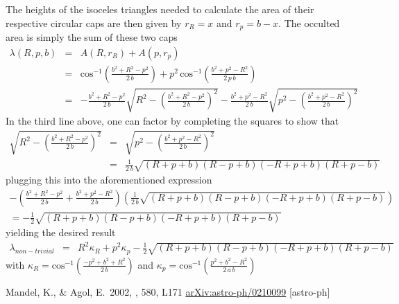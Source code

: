 \documentclass[12pt,preprint]{aastex}
\begin{document}
The heights of the isoceles triangles needed to calculate the area of their
respective circular caps are then given by $r_R = x$ and $r_p = b-x$.  The
occulted area is simply the sum of these two caps
\begin{eqnarray}
    \lambda(R,p,b) & = & A(R,r_R) + A(p,r_p) \\
                   & = & \mathrm{cos}^{-1} \left( \frac{b^2 + R^2 - p^2}{2
                                                        \, b } \right) + p^2
                         \, \mathrm{cos}^{-1} \left( \frac{b^2 + p^2
                                                - R^2}{2 \, p \, b} \right) \\
                   & = & - \frac{b^2 + R^2 - p^2}{2 \, b} \sqrt{R^2 -
                    \left( \frac{b^2 + R^2 - p^2}{2 \, b}
                    \right)^2 } - \frac{b^2 + p^2 -R^2}{2 \, b}
                    \sqrt{ p^2 - \left( \frac{b^2 + p^2 - R^2}{2 \, b}
                    \right)^2 } \nonumber
\end{eqnarray}
\newpage
In the third line above, one can factor by completing the squares to show
that
\begin{eqnarray}
    \sqrt{R^2 - \left( \frac{b^2 + R^2 - p^2}{2 \, b} \right)^2 } \nonumber
        & = & \sqrt{ p^2 - \left( \frac{b^2 + p^2 - R^2}{2 \, b}
        \right)^2} \nonumber \\
        & = & \frac{1}{2 \, b} \sqrt{(R+p+b)(R-p+b)(-R+p+b)(R+p-b)} \nonumber
\end{eqnarray}
plugging this into the aforementioned expression
\begin{eqnarray}
    - \left( \frac{b^2 +R^2 - p^2}{2 \, b} + \frac{b^2 + p^2 - R^2}{2 \, b}
    \right) \left( \frac{1}{2 \, b} \sqrt{(R+p+b)(R-p+b)(-R+p+b)(R+p-b)}
    \right) \nonumber \\
         =  - \frac{1}{2} \sqrt{(R+p+b)(R-p+b)(-R+p+b)(R+p-b)} \nonumber
\end{eqnarray}
yielding the desired result
\begin{eqnarray}
    \lambda_{non-trivial} & = & R^2 \kappa_R + p^2 \kappa_p - \frac{1}{2}
          \sqrt{(R+p+b)(R-p+b)(-R+p+b)(R+p-b)} \nonumber
\end{eqnarray}
with $\kappa_R = \mathrm{cos}^{-1} \left( \frac{-p^2 + b^2 +R^2}{2 \, b}
\right)$ and $\kappa_p = \mathrm{cos}^{-1}
\left( \frac{p^2 + b^2 -R^2}{2 \, a \, b} \right)$
\newcommand{\arxiv}[1]{\href{http://arxiv.org/abs/#1}{arXiv:#1}}
\begin{thebibliography}{}\raggedright

        Mandel, K., \& Agol, E.\ 2002, \apjl, 580, L171
        \arxiv{astro-ph/0210099} [astro-ph]

\end{thebibliography}
\end{document}
